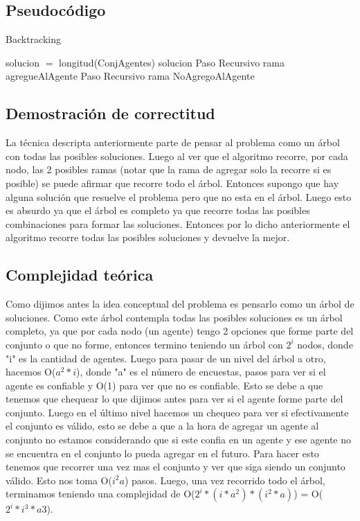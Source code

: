\subsection{Pseudocódigo}

\begin{algorithm}[H]
\caption{Backtracking}\label{Ej1}

\begin{algorithmic}[H]
\State solucion $=$ longitud(ConjAgentes)
\EndIf
\State\Return solucion
\EndIf
{}
\State Paso Recursivo rama agregueAlAgente
\EndIf
\State Paso Recursivo rama NoAgregoAlAgente
\EndProcedure
\end{algorithmic}

\end{algorithm}

\subsection{Demostración de correctitud}

	La técnica descripta anteriormente parte de pensar al problema como un árbol con todas las posibles soluciones. Luego al ver que el algoritmo recorre, por cada nodo, las 2 posibles ramas (notar que la rama de agregar solo la recorre si es posible) se puede afirmar que recorre todo el árbol. Entonces supongo que hay alguna solución que resuelve el problema pero que no esta en el árbol. Luego esto es absurdo ya que el árbol es completo ya que recorre todas las posibles combinaciones para formar las soluciones. Entonces por lo dicho anteriormente el algoritmo recorre todas las posibles soluciones y devuelve la mejor.

\subsection{Complejidad teórica}
	
	Como dijimos antes la idea conceptual del problema es pensarlo como un árbol de soluciones. Como este árbol contempla todas las posibles soluciones es un árbol completo, ya que por cada nodo (un agente) tengo 2 opciones que forme parte del conjunto o que no forme, entonces termino teniendo un árbol con $2^{i}$ nodos, donde "i" es la cantidad de agentes. Luego para pasar de un nivel del árbol a otro, hacemos O($a^{2}*i$), donde "a" es el número de encuestas, pasos para ver si el agente es confiable y O(1) para ver que no es confiable. Esto se debe a que tenemos que chequear lo que dijimos antes para ver si el agente forme parte del conjunto. Luego en el último nivel hacemos un chequeo para ver si efectivamente el conjunto es válido, esto se debe a que a la hora de agregar un agente al conjunto no estamos considerando que si este confia en un agente y ese agente no se encuentra en el conjunto lo pueda agregar en el futuro. Para hacer esto tenemos que recorrer una vez mas el conjunto y ver que siga siendo un conjunto válido. Esto nos toma O($i^{2}a$) pasos. Luego, una vez recorrido todo el árbol, terminamos teniendo una complejidad de O($2^{i}*(i*a^{2})*(i^{2}*a)$) = O($2^{i}*i^{3}*a{3}$).
	
